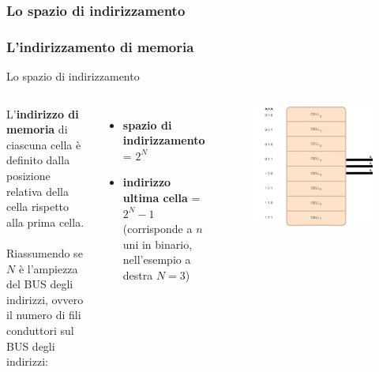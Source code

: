 \subsubsection[Lo spazio di indirizzamento]{Lo spazio di indirizzamento}
\begin{frame}
	\frametitle{L'indirizzamento di memoria}
	  
	\begin{block}{Lo spazio di indirizzamento}
	
		\begin{columns}			
			L’\textbf{indirizzo di memoria} di ciascuna cella è definito dalla posizione relativa della cella rispetto alla prima cella.\\~\\
			Riassumendo se $N$ è l'ampiezza del BUS degli indirizzi, ovvero il numero di fili conduttori sul BUS degli indirizzi:
			\begin{itemize}
				\item \textbf{spazio di indirizzamento} = $2^N$
				\item \textbf{indirizzo ultima cella} = $2^N - 1$ (corrisponde a $n$ uni in binario, nell'esempio a destra $N=3$)
			\end{itemize}
			
	
			\begin{figure}[!htbp]
				\centering 
				\includegraphics[width=1.0\linewidth]{images/5_memory/memory_address.pdf}
			\end{figure}
		\end{columns}
		
	\end{block}
\end{frame}



